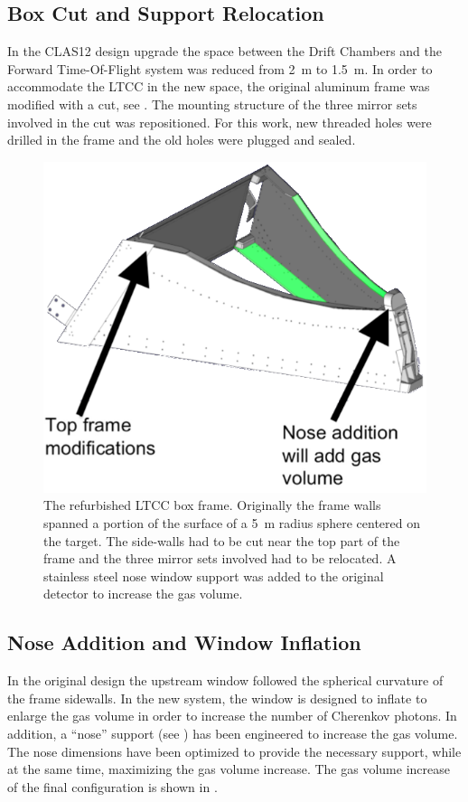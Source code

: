 \subsection{Box Cut and Support Relocation }

In the CLAS12 design upgrade the space between the Drift Chambers and the Forward Time-Of-Flight system
was reduced from 2~m to 1.5~m.
In order to accommodate the LTCC in the new space, the original aluminum frame was modified with a cut, see .
The mounting structure of the three mirror sets involved in the cut was repositioned. For this work, new threaded holes were
drilled in the frame and the old holes were plugged and sealed.

\begin{figure}
	\centering
	\includegraphics[width=1.0\columnwidth, height=0.75\columnwidth]{img/boxCut.png}
	\caption{The refurbished LTCC box frame. Originally the frame walls spanned a portion of the surface of a 5~m
          radius sphere centered on the target. The side-walls had to be cut near the top part of the frame and the three
          mirror sets involved had to be relocated. A stainless steel nose window support was added to the original detector
          to increase the gas volume.}
	\label{fig:boxCut}
\end{figure}

\subsection{Nose Addition and Window Inflation}

In the original design the upstream window followed the spherical curvature of the frame sidewalls. In the new system, the window is
designed to inflate to enlarge the gas volume in order to increase the number of Cherenkov photons. In addition, a ``nose''
support (see ) has been engineered to increase the gas volume.
The nose dimensions have been optimized to provide the necessary support, while at the same time, maximizing the gas volume increase.
The gas volume increase of the final configuration is shown in .

